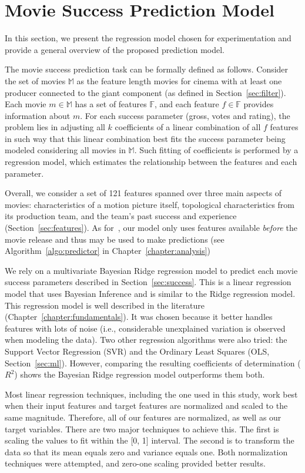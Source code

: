 \section{Movie Success Prediction Model}
\label{sec:model:prediction}
In this section, we present the regression model chosen for experimentation
and provide a general overview of the proposed prediction model.

The movie success prediction task can be formally defined as follows. Consider
the set of movies $\mathbb{M}$ as the feature length movies for cinema with at
least one producer connected to the giant component (as defined in
Section~\ref{sec:filter}). Each movie $m \in \mathbb{M}$ has a set of features
$\mathbb{F}$, and each feature $f \in \mathbb{F}$ provides information about
$m$. For each success parameter (gross, votes and rating), the problem lies in
adjusting all $k$ coefficients of a linear combination of all $f$ features in
such way that this linear combination best fits the success parameter being
modeled considering all movies in $\mathbb{M}$. Such fitting of coefficients is
performed by a regression model, which estimates the relationship between the
features and each parameter.

Overall, we consider a set of 121 features spanned over three main aspects of
movies: characteristics of a motion picture itself, topological characteristics
from its production team, and the team's past success and experience
(Section~\ref{sec:features}). As for~\cite{Ghiassi2015}, our model only uses
features available \textit{before} the movie release and thus may be used to
make predictions (see Algorithm~\ref{algo:predictor} in
Chapter~\ref{chapter:analysis})

We rely on a multivariate Bayesian Ridge regression model to predict each movie
success parameters described in Section~\ref{sec:success}. This is a linear
regression model that uses Bayesian Inference and is similar to the Ridge
regression model. This regression model is well described in the literature
(Chapter~\ref{chapter:fundamentals}). It was chosen because it better handles
features with lots of noise (i.e., considerable unexplained variation is
observed when modeling the data). Two other regression algorithms were also
tried: the Support Vector Regression (SVR) and the Ordinary Least Squares (OLS,
Section~\ref{sec:ml}). However, comparing the resulting coefficients of
determination ($R^2$) shows the Bayesian Ridge regression model outperforms
them both.

Most linear regression techniques, including the one used in this study, work
best when their input features and target features are normalized and scaled to
the same magnitude. Therefore, all of our features are normalized, as well as
our target variables. There are two major techniques to achieve this. The first
is scaling the values to fit within the [0, 1] interval. The second is to
transform the data so that its mean equals zero and variance equals one.  Both
normalization techniques were attempted, and zero-one scaling provided better
results.
